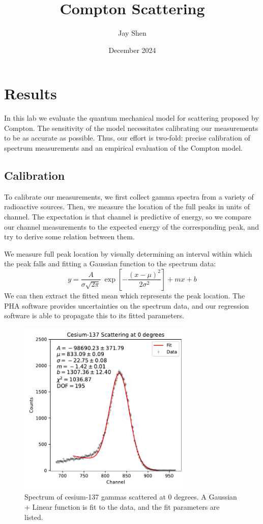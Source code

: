\documentclass[12pt, letterpaper]{article}
\title{Compton Scattering}
\author{Jay Shen}
\date{December 2024}
\begin{document}
\maketitle

\section{Results}

In this lab we evaluate the quantum mechanical model for scattering proposed by Compton. The sensitivity of the model necessitates calibrating our measurements to be as accurate as possible. Thus, our effort is two-fold: precise calibration of spectrum measurements and an empirical evaluation of the Compton model. 

\subsection{Calibration}

To calibrate our measurements, we first collect gamma spectra from a variety of radioactive sources. Then, we measure the location of the full peaks in units of channel. The expectation is that channel is predictive of energy, so we compare our channel measurements to the expected energy of the corresponding peak, and try to derive some relation between them. 

We measure full peak location by visually determining an interval within which the peak falls and fitting a Gaussian function to the spectrum data: 
\[
    y = \frac{A}{\sigma \sqrt{2 \pi}} \: \exp[- \frac{(x - \mu)^2}{2 \sigma^2}] + mx + b
\]
We can then extract the fitted mean which represents the peak location. The PHA software provides uncertainties on the spectrum data, and our regression software is able to propagate this to its fitted parameters. 

\begin{figure}[!h]
    \centering
    \includegraphics[width=0.75\textwidth]{experiment2/figures/scattering3/0.pdf}
    \caption{Spectrum of cesium-137 gammas scattered at 0 degrees. A Gaussian + Linear function is fit to the data, and the fit parameters are listed. }
    \label{fig:scattering-0}
\end{figure}
\end{document}
